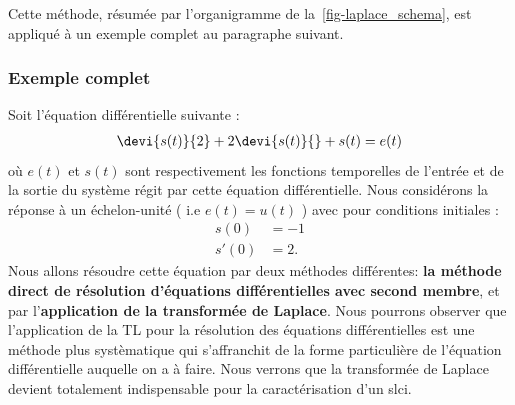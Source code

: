 Cette méthode, résumée par l'organigramme de la~\cref{fig-laplace_schema}, 
est appliqué à un exemple complet au paragraphe suivant.
\subsubsection{Exemple complet}
Soit l'équation différentielle suivante :
\begin{align}
\devi{s(t)}{2}+2\devi{s(t)}{} + s(t) = e(t)\label{eq-diff1}
\end{align}
où $e(t)$ et $s(t)$ sont respectivement les fonctions temporelles de l'entrée 
et de la sortie du système régit par cette équation différentielle. 
Nous considérons la réponse à un échelon-unité ( i.e $e(t)=u(t)$ ) 
avec pour conditions initiales :
\begin{align*}
    s(0) &=-1\\
    s'(0)&=2.
\end{align*}
Nous allons résoudre cette équation par deux méthodes différentes: 
\textbf{la méthode direct de résolution d'équations différentielles avec 
second membre}, et par l'\textbf{application de la transformée de Laplace}.
Nous pourrons observer que l'application de la TL pour la résolution
des équations différentielles est une méthode plus systèmatique qui 
s'affranchit de la forme particulière de l'équation différentielle 
auquelle on a à faire. Nous verrons que la transformée de Laplace devient 
totalement indispensable pour la caractérisation d'un \gls{slci}.
\newpage
{}
